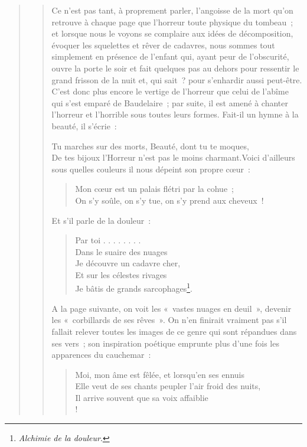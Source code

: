 \documentclass[french,twoside]{book} %
\begin{document}
\begin{verse}
\begin{verse}
\noindent Ce n’est pas tant, à proprement parler, l’angoisse de la mort qu’on retrouve à chaque page que l’horreur toute physique du tombeau ; et lorsque nous le voyons se complaire aux idées de décomposition, évoquer les squelettes et rêver de cadavres, nous sommes tout simplement en présence de l’enfant qui, ayant peur de l’obscurité, ouvre la porte le soir et fait quelques pas au dehors pour ressentir le grand frisson de la nuit et, qui sait ? pour s’enhardir aussi peut-être. C’est donc plus encore le vertige de l’horreur que celui de l’abîme qui s’est emparé de Baudelaire ; par suite, il est amené à chanter l’horreur et l’horrible sous toutes leurs formes. Fait-il un hymne à la beauté, il s’écrie :\par

Tu marches sur des morts, Beauté, dont tu te moques,\\

\noindent De tes bijoux l’Horreur n’est pas le moins charmant.Voici d’ailleurs sous quelles couleurs il nous dépeint son propre cœur :\par


\begin{verse}
Mon cœur est un palais flétri par la cohue ;\\
On s’y soûle, on s’y tue, on s’y prend aux cheveux !\\
\end{verse}

\noindent Et s’il parle de la douleur :\par


\begin{verse}
Par toi . . . . . . . .\\
Dans le suaire des nuages\\
Je découvre un cadavre cher,\\
Et sur les célestes rivages\\
Je bâtis de grands sarcophages\footnote{\emph{Alchimie de la douleur}.}.\\
\end{verse}

\noindent A la page suivante, on voit les « vastes nuages en deuil », devenir les « corbillards de ses rêves ». On n’en finirait vraiment pas s’il fallait relever toutes les images de ce genre qui sont répandues dans ses vers ; son inspiration poétique emprunte plus d’une fois les apparences du cauchemar :\par


\begin{verse}
Moi, mon âme est fêlée, et lorsqu’en ses ennuis\\
Elle veut de ses chants peupler l’air froid des nuits,\\
Il arrive souvent que sa voix affaiblie\\!


\end{verse}
\end{verse}
\end{verse}
\end{document}
